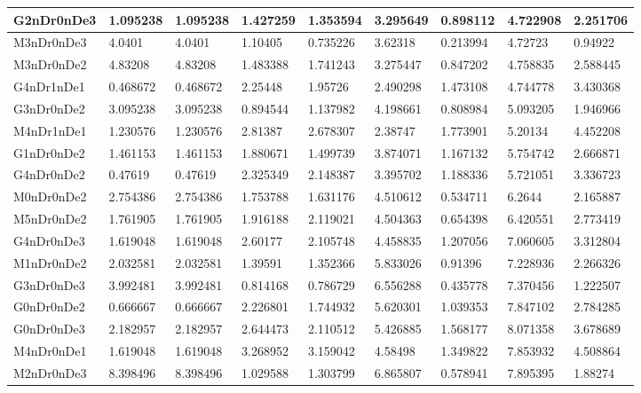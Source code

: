 \documentclass[../thesis.tex]{subfiles}
\begin{document}
\begin{table}[!ht]
\begin{tabular}{|l|l|l|l|l|l|l|l|l|}
        G2nDr0nDe3 & 1.095238 & 1.095238 & 1.427259 & 1.353594 & 3.295649 & 0.898112 & 4.722908 & 2.251706 \\ \hline
        M3nDr0nDe3 & 4.0401 & 4.0401 & 1.10405 & 0.735226 & 3.62318 & 0.213994 & 4.72723 & 0.94922 \\ \hline
        M3nDr0nDe2 & 4.83208 & 4.83208 & 1.483388 & 1.741243 & 3.275447 & 0.847202 & 4.758835 & 2.588445 \\ \hline
        G4nDr1nDe1 & 0.468672 & 0.468672 & 2.25448 & 1.95726 & 2.490298 & 1.473108 & 4.744778 & 3.430368 \\ \hline
        G3nDr0nDe2 & 3.095238 & 3.095238 & 0.894544 & 1.137982 & 4.198661 & 0.808984 & 5.093205 & 1.946966 \\ \hline
        M4nDr1nDe1 & 1.230576 & 1.230576 & 2.81387 & 2.678307 & 2.38747 & 1.773901 & 5.20134 & 4.452208 \\ \hline
        G1nDr0nDe2 & 1.461153 & 1.461153 & 1.880671 & 1.499739 & 3.874071 & 1.167132 & 5.754742 & 2.666871 \\ \hline
        G4nDr0nDe2 & 0.47619 & 0.47619 & 2.325349 & 2.148387 & 3.395702 & 1.188336 & 5.721051 & 3.336723 \\ \hline
        M0nDr0nDe2 & 2.754386 & 2.754386 & 1.753788 & 1.631176 & 4.510612 & 0.534711 & 6.2644 & 2.165887 \\ \hline
        M5nDr0nDe2 & 1.761905 & 1.761905 & 1.916188 & 2.119021 & 4.504363 & 0.654398 & 6.420551 & 2.773419 \\ \hline
        G4nDr0nDe3 & 1.619048 & 1.619048 & 2.60177 & 2.105748 & 4.458835 & 1.207056 & 7.060605 & 3.312804 \\ \hline
        M1nDr0nDe2 & 2.032581 & 2.032581 & 1.39591 & 1.352366 & 5.833026 & 0.91396 & 7.228936 & 2.266326 \\ \hline
        G3nDr0nDe3 & 3.992481 & 3.992481 & 0.814168 & 0.786729 & 6.556288 & 0.435778 & 7.370456 & 1.222507 \\ \hline
        G0nDr0nDe2 & 0.666667 & 0.666667 & 2.226801 & 1.744932 & 5.620301 & 1.039353 & 7.847102 & 2.784285 \\ \hline
        G0nDr0nDe3 & 2.182957 & 2.182957 & 2.644473 & 2.110512 & 5.426885 & 1.568177 & 8.071358 & 3.678689 \\ \hline
        M4nDr0nDe1 & 1.619048 & 1.619048 & 3.268952 & 3.159042 & 4.58498 & 1.349822 & 7.853932 & 4.508864 \\ \hline
        M2nDr0nDe3 & 8.398496 & 8.398496 & 1.029588 & 1.303799 & 6.865807 & 0.578941 & 7.895395 & 1.88274 \\ \hline

\end{tabular}
\end{table}
\end{document}
